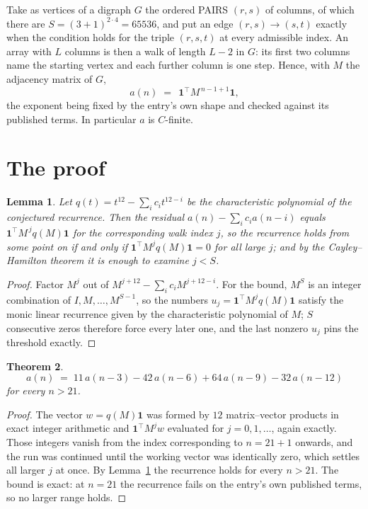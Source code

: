 \documentclass[11pt,a4paper]{article}
\theoremstyle{plain}
\newtheorem{theorem}{Theorem}
\newtheorem{lemma}[theorem]{Lemma}
\theoremstyle{definition}
\begin{document}
Take as vertices of a digraph $G$ the ordered PAIRS $(r,s)$ of columns, of which there are
$S=(3+1)^{2\cdot4}=65536$, and put an edge $(r,s)\to(s,t)$ exactly when the condition
holds for the triple $(r,s,t)$ at every admissible index. An array with $L$ columns is then a
walk of length $L-2$ in $G$: its first two columns name the starting vertex and each further
column is one step. Hence, with $M$ the adjacency matrix of $G$,
\[
a(n)\;=\;\,\mathbf{1}^{\!\top}M^{\,n-1+1}\mathbf{1},
\]
the exponent being fixed by the entry's own shape and checked against its published terms.
In particular $a$ is $C$-finite.

\section{The proof}

\begin{lemma}\label{lem:crit}
Let $q(t)=t^{12}-\sum_i c_it^{12-i}$ be the characteristic polynomial of the
conjectured recurrence. Then the residual $a(n)-\sum_ic_ia(n-i)$ equals
$\mathbf{1}^{\!\top}M^{\,j}q(M)\mathbf{1}$ for the corresponding walk index
$j$, so the recurrence holds from some point on if and only if
$\mathbf{1}^{\!\top}M^{j}q(M)\mathbf{1}=0$ for all large $j$; and by the
Cayley--Hamilton theorem it is enough to examine $j<S$.
\end{lemma}

\begin{proof}
Factor $M^{j}$ out of $M^{j+12}-\sum_ic_iM^{j+12-i}$. For the bound, $M^{S}$
is an integer combination of $I,M,\dots,M^{S-1}$, so the numbers
$u_j=\mathbf{1}^{\!\top}M^{j}q(M)\mathbf{1}$ satisfy the monic linear recurrence given by
the characteristic polynomial of $M$; $S$ consecutive zeros therefore force every later one,
and the last nonzero $u_j$ pins the threshold exactly.
\end{proof}

\begin{theorem}
\[
a(n)\;=\;11\,a(n-3) - 42\,a(n-6) + 64\,a(n-9) - 32\,a(n-12)
\]
for every $n>21$.
\end{theorem}

\begin{proof}
The vector $w=q(M)\mathbf{1}$ was formed by $12$ matrix--vector products in exact
integer arithmetic and $\mathbf{1}^{\!\top}M^{j}w$ evaluated for $j=0,1,\dots$, again
exactly. Those integers vanish from the index corresponding to $n=21+1$ onwards, and the
run was continued until the working vector was identically zero, which settles all larger $j$
at once. By Lemma~\ref{lem:crit} the recurrence holds for every $n>21$. The bound is exact: at $n=21$ the recurrence fails on the entry's own published terms, so no larger range holds.
\end{proof}
\end{document}
